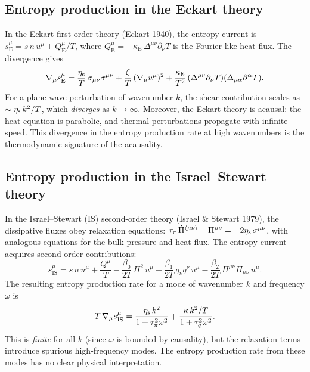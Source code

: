 \subsection{Entropy production in the Eckart theory}
\label{sec:rel-14-eckart}

In the Eckart first-order theory (Eckart 1940), the entropy current
is $s^\mu_{\mathrm{E}} = s\,n\,u^\mu + Q^\mu_{\mathrm{E}}/T$,
where $Q^\mu_{\mathrm{E}} = -\kappa_{\mathrm{E}}\,\Delta^{\mu\nu}
\partial_\nu T$ is the Fourier-like heat flux.  The divergence gives
\begin{equation}
\label{eq:eckart-entropy-prod}
\nabla_\mu s^\mu_{\mathrm{E}}
= \frac{\eta_{\mathrm{s}}}{T}\,\sigma_{\mu\nu}\sigma^{\mu\nu}
+ \frac{\zeta}{T}\,(\nabla_\mu u^\mu)^2
+ \frac{\kappa_{\mathrm{E}}}{T^2}\,
  (\Delta^{\mu\nu}\partial_\nu T)(\Delta_{\mu\alpha}\partial^\alpha T).
\end{equation}
For a plane-wave perturbation of wavenumber $k$, the shear
contribution scales as $\sim \eta_{\mathrm{s}}\,k^2/T$, which
\emph{diverges} as $k\to\infty$.  Moreover, the Eckart theory is
acausal: the heat equation is parabolic, and thermal perturbations
propagate with infinite speed.  This divergence in the entropy
production rate at high wavenumbers is the thermodynamic signature
of the acausality.

\subsection{Entropy production in the Israel--Stewart theory}
\label{sec:rel-14-IS}

In the Israel--Stewart (IS) second-order theory (Israel \& Stewart
1979), the dissipative fluxes obey relaxation equations:
$\tau_{\pi}\,\dot{\Pi}^{\langle\mu\nu\rangle} + \Pi^{\mu\nu}
= -2\eta_{\mathrm{s}}\,\sigma^{\mu\nu}$, with analogous equations for the
bulk pressure and heat flux.  The entropy current acquires
second-order contributions:
\begin{equation}
\label{eq:IS-entropy-current}
s^\mu_{\mathrm{IS}} = s\,n\,u^\mu + \frac{Q^\mu}{T}
- \frac{\beta_0}{2T}\,\Pi^2\,u^\mu
- \frac{\beta_1}{2T}\,q_\nu q^\nu\,u^\mu
- \frac{\beta_2}{2T}\,\Pi^{\mu\nu}\Pi_{\mu\nu}\,u^\mu.
\end{equation}
The resulting entropy production rate for a mode of wavenumber $k$
and frequency $\omega$ is
\begin{equation}
\label{eq:IS-entropy-prod-mode}
T\,\nabla_\mu s^\mu_{\mathrm{IS}}
= \frac{\eta_{\mathrm{s}}\,k^2}{1 + \tau_{\pi}^2\omega^2}
+ \frac{\kappa\,k^2/T}{1 + \tau_{q}^2\omega^2}.
\end{equation}
This is \emph{finite} for all $k$ (since $\omega$ is bounded by
causality), but the relaxation terms introduce spurious
high-frequency modes.  The entropy production rate from these
modes has no clear physical interpretation.

